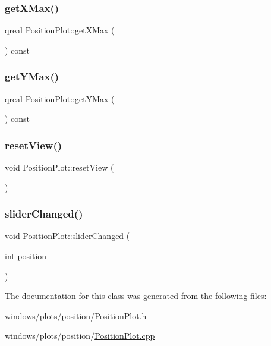 \subsubsection{\texorpdfstring{get\+X\+Max()}{getXMax()}}
{\footnotesize\ttfamily qreal Position\+Plot\+::get\+X\+Max (\begin{DoxyParamCaption}{ }\end{DoxyParamCaption}) const}

\mbox{\label{class_position_plot_a2a69244304b8495e090d777280775723}} 
\subsubsection{\texorpdfstring{get\+Y\+Max()}{getYMax()}}
{\footnotesize\ttfamily qreal Position\+Plot\+::get\+Y\+Max (\begin{DoxyParamCaption}{ }\end{DoxyParamCaption}) const}

\mbox{\label{class_position_plot_a9901c04061a3e7bdef306079d2ab93e5}} 
\subsubsection{\texorpdfstring{reset\+View()}{resetView()}}
{\footnotesize\ttfamily void Position\+Plot\+::reset\+View (\begin{DoxyParamCaption}{ }\end{DoxyParamCaption})}

\mbox{\label{class_position_plot_af739f0b7496fecbaff181df96f16a9e8}} 
\subsubsection{\texorpdfstring{slider\+Changed()}{sliderChanged()}}
{\footnotesize\ttfamily void Position\+Plot\+::slider\+Changed (\begin{DoxyParamCaption}\item[{int}]{position }\end{DoxyParamCaption})}



The documentation for this class was generated from the following files\+:\begin{DoxyCompactItemize}
\item 
windows/plots/position/\hyperlink{_position_plot_8h}{Position\+Plot.\+h}\item 
windows/plots/position/\hyperlink{_position_plot_8cpp}{Position\+Plot.\+cpp}\end{DoxyCompactItemize}
